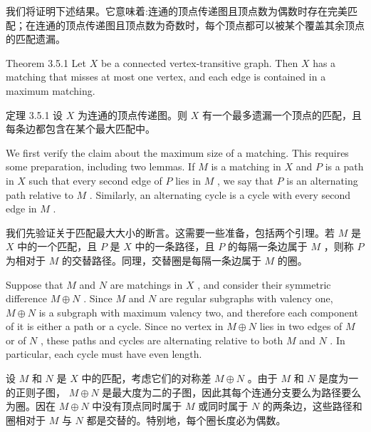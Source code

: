 \documentclass[10pt]{article}
\begin{document}
\begin{tcolorbox}\relax
我们将证明下述结果。它意味着:连通的顶点传递图且顶点数为偶数时存在完美匹配；在连通的顶点传递图且顶点数为奇数时，每个顶点都可以被某个覆盖其余顶点的匹配遗漏。
\end{tcolorbox}

Theorem 3.5.1 Let \(X\) be a connected vertex-transitive graph. Then \(X\) has a matching that misses at most one vertex, and each edge is contained in a maximum matching.

\begin{tcolorbox}\relax
定理 3.5.1 设 \(X\) 为连通的顶点传递图。则 \(X\) 有一个最多遗漏一个顶点的匹配，且每条边都包含在某个最大匹配中。
\end{tcolorbox}

We first verify the claim about the maximum size of a matching. This requires some preparation, including two lemmas. If \(M\) is a matching in \(X\) and \(P\) is a path in \(X\) such that every second edge of \(P\) lies in \(M\) , we say that \(P\) is an alternating path relative to \(M\) . Similarly, an alternating cycle is a cycle with every second edge in \(M\) .

\begin{tcolorbox}\relax
我们先验证关于匹配最大大小的断言。这需要一些准备，包括两个引理。若 \(M\) 是 \(X\) 中的一个匹配，且 \(P\) 是 \(X\) 中的一条路径，且 \(P\) 的每隔一条边属于 \(M\) ，则称 \(P\) 为相对于 \(M\) 的交替路径。同理，交替圈是每隔一条边属于 \(M\) 的圈。
\end{tcolorbox}

Suppose that \(M\) and \(N\) are matchings in \(X\) , and consider their symmetric difference \(M \oplus  N\) . Since \(M\) and \(N\) are regular subgraphs with valency one, \(M \oplus  N\) is a subgraph with maximum valency two, and therefore each component of it is either a path or a cycle. Since no vertex in \(M \oplus  N\) lies in two edges of \(M\) or of \(N\) , these paths and cycles are alternating relative to both \(M\) and \(N\) . In particular, each cycle must have even length.

\begin{tcolorbox}\relax
设 \(M\) 和 \(N\) 是 \(X\) 中的匹配，考虑它们的对称差 \(M \oplus  N\) 。由于 \(M\) 和 \(N\) 是度为一的正则子图， \(M \oplus  N\) 是最大度为二的子图，因此其每个连通分支要么为路径要么为圈。因在 \(M \oplus  N\) 中没有顶点同时属于 \(M\) 或同时属于 \(N\) 的两条边，这些路径和圈相对于 \(M\) 与 \(N\) 都是交替的。特别地，每个圈长度必为偶数。
\end{tcolorbox}
\end{document}
